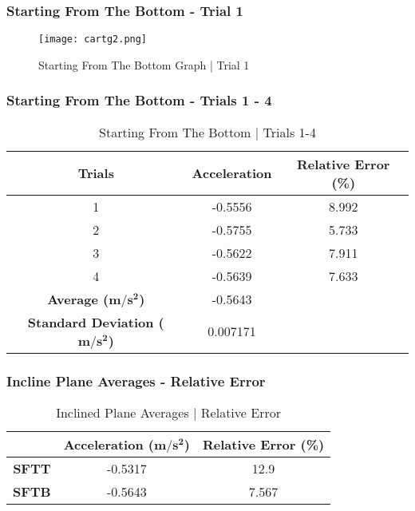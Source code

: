 \subsubsection{Starting From The Bottom - Trial 1}
\begin{figure}[H]
	\begin{center}
		\texttt{[image: cartg2.png]}
	\end{center}
	\caption{Starting From The Bottom Graph | Trial 1}
	\label{fig: cartg2}
\end{figure} 


\subsubsection{Starting From The Bottom - Trials 1 - 4}

\begin{table}[H]
\centering
\begin{tabular}{@{}ccc@{}}
\toprule
\textbf{Trials} & \textbf{Acceleration} & \textbf{Relative Error (\%)} \\ \midrule
1 & -0.5556 & 8.992 \\
2 & -0.5755 & 5.733 \\
3 & -0.5622 & 7.911 \\
4 & -0.5639 & 7.633 \\ \midrule
\textbf{Average ($\boldsymbol{m/s^2}$)} & -0.5643 &  \\
\textbf{Standard Deviation ($\boldsymbol{m/s^2}$)} & 0.007171 &  \\ \bottomrule
\end{tabular}
\caption{Starting From The Bottom | Trials 1-4}
\label{tab:ip-sftb}
\end{table}

\subsubsection{Incline Plane Averages - Relative Error}
\begin{table}[H]
\centering
\begin{tabular}{@{}ccc@{}}
\toprule
 & \textbf{Acceleration ($\boldsymbol{m/s^2}$)} & \textbf{Relative Error (\%)} \\ \midrule
\textbf{SFTT} & -0.5317 & 12.9 \\
\textbf{SFTB} & -0.5643 & 7.567 \\ \bottomrule

\end{tabular}
\caption{Inclined Plane Averages | Relative Error}
\label{tab:ip-re}
\end{table}
